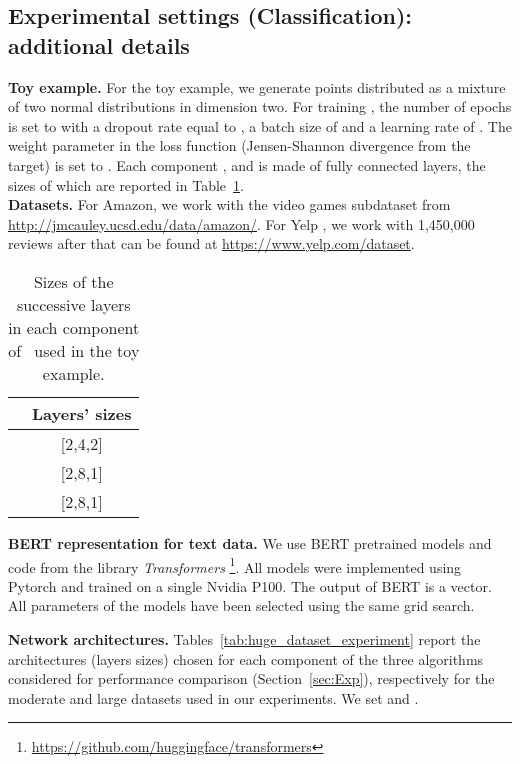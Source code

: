 \subsection{Experimental settings (Classification): additional details}
\label{additional_exp_classif}

\textbf{Toy example. } For the toy example, we generate  points distributed as a mixture of two normal distributions in dimension two. For training \HTalgo, the number of epochs is set to  with a  dropout rate equal to , a  batch size of  and a learning rate of . The weight parameter  in the loss function (Jensen-Shannon divergence from the target) is set to . 
Each component ,  and  is made of  fully connected layers, the sizes of which are reported in  Table~\ref{tab:toys_dataset_experiment}. \\
\textbf{Datasets.} For Amazon, we
  work with the video games subdataset from
  \url{http://jmcauley.ucsd.edu/data/amazon/}. For Yelp \cite{yelp_1,yelp_2}, we work with 1,450,000 reviews after that can be found at
  \url{https://www.yelp.com/dataset}. 




\begin{table}[ht]
    \centering
    \begin{tabular}{c|c}\hline
&     Layers' sizes \\ \hline
  & [2,4,2]   \\
 &  [2,8,1]   \\
 &  [2,8,1] \\
\end{tabular}
    \caption{ Sizes of the successive layers in each component of \HTalgo\ used in the toy example. }
    \label{tab:toys_dataset_experiment}
\end{table}

\textbf{BERT representation for text data.} 
We use BERT pretrained models and code from the library \textit{Transformers} \footnote{\url{https://github.com/huggingface/transformers}}. All models were implemented using Pytorch and trained on a single Nvidia P100. The output of BERT is a  vector. All parameters of the models have been selected using the same grid search. 

\textbf{Network architectures.}
Tables~\ref{tab:huge_dataset_experiment} report the architectures (layers sizes) chosen for each component of the three algorithms considered for performance comparison (Section~\ref{sec:Exp}), respectively for the moderate and large datasets used in our experiments.  We set  and .




